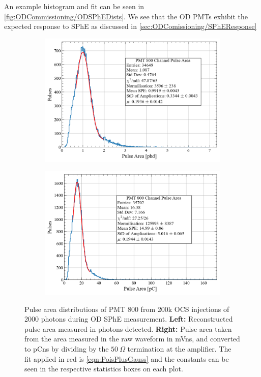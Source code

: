 An example histogram and fit can be seen in \autoref{fig:ODCommissioning/ODSPhEDists}. We see that the OD PMTs exhibit the expected response to SPhE as discussed in \autoref{sec:ODComissioning/SPhEResponse}

\begin{figure}
     \centering
     \begin{subfigure}[b]{0.47\textwidth}
         \centering
         \includegraphics[width=\textwidth]{figures/ODCommissioning/PMT800_PulseArea_Distribution.png}
         \caption{}
         \label{fig:ODCommissioning/ODSPhE_phd}
     \end{subfigure}
     \begin{subfigure}[b]{0.47\textwidth}
         \centering
         \includegraphics[width=\textwidth]{figures/ODCommissioning/PMT800_PulseArea_Distribution_pC.png}
         \caption{}
         \label{fig:ODCommissioning/ODSPhE_pC}
     \end{subfigure}
        \caption{Pulse area distributions of PMT 800 from 200k OCS injections of 2000 photons during OD SPhE measurement. \textbf{Left:} Reconstructed pulse area measured in photons detected. \textbf{Right:} Pulse area taken from the area measured in the raw waveform in mVns, and converted to pCns by dividing by the $50~\Omega$ termination at the amplifier. The fit applied in red is \autoref{eqn:PoisPlusGauss} and the constants can be seen in the respective statistics boxes on each plot.}
        \label{fig:ODCommissioning/ODSPhEDists}
\end{figure}
